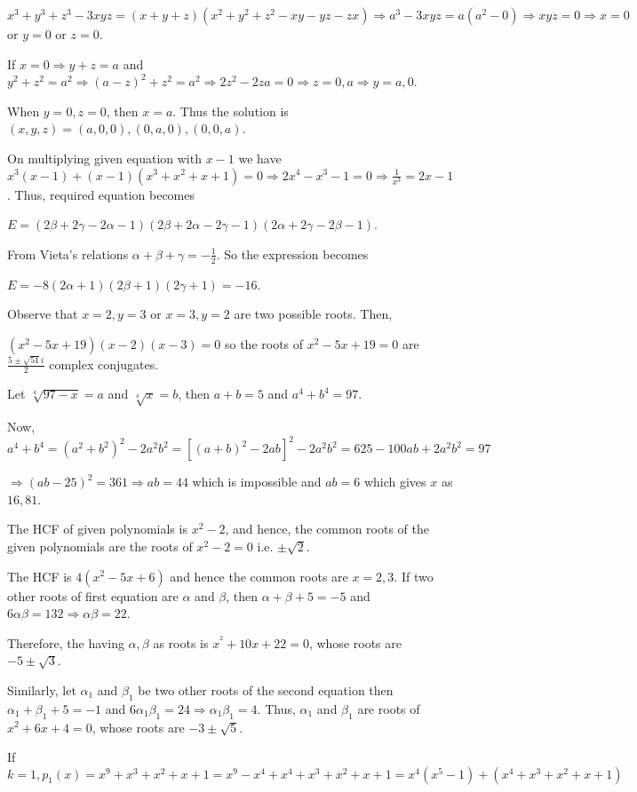   $x^3 + y^3 + z^3 - 3xyz = (x + y + z)(x^2 + y^2 + z^2 - xy - yz - zx) \Rightarrow a^3 - 3xyz = a(a^2 - 0)
  \Rightarrow xyz = 0 \Rightarrow x = 0$ or $y = 0$ or $z = 0$.

  If $x = 0 \Rightarrow y + z = a$ and $y^2 + z^2 = a^2 \Rightarrow (a - z)^2 + z^2 = a^2 \Rightarrow 2z^2 -
  2za = 0 \Rightarrow z = 0, a\Rightarrow y = a, 0$.

  When $y = 0, z = 0$, then $x = a$. Thus the solution is $(x, y, z) = (a, 0, 0), (0, a, 0), (0, 0, a)$.
\item On multiplying given equation with $x - 1$ we have $x^3(x - 1) + (x - 1)(x^3 + x^2 + x + 1) = 0
  \Rightarrow 2x^4 - x^3 - 1 = 0 \Rightarrow \frac{1}{x^3} = 2x - 1$. Thus, required equation becomes

  $E = (2\beta + 2\gamma - 2\alpha - 1)(2\beta + 2\alpha - 2\gamma - 1)(2\alpha + 2\gamma - 2\beta - 1)$.

  From Vieta's relations $\alpha + \beta + \gamma = -\frac{1}{2}$. So the expression becomes

  $E = -8(2\alpha + 1)(2\beta + 1)(2\gamma + 1) = -16$.
\item Observe that $x = 2, y = 3$ or $x = 3, y = 2$ are two possible roots. Then,

  $(x^2 - 5x + 19)(x - 2)(x - 3) = 0$ so the roots of $x^2 - 5x + 19 = 0$ are $\frac{5\pm\sqrt{51}i}{2}$
  complex conjugates.
\item Let $\sqrt[4]{97 - x} = a$ and $\sqrt[4]{x} = b$, then $a + b = 5$ and $a^4 + b^4 = 97$.

  Now, $a^4 + b^4 = (a^2 + b^2)^2 - 2a^2b^2 = [(a + b)^2 - 2ab]^2 - 2a^2b^2 = 625 - 100ab + 2a^2b^2 = 97$

  $\Rightarrow (ab - 25)^2 = 361 \Rightarrow ab = 44$ which is impossible and $ab = 6$ which gives $x$ as
  $16, 81$.
\item The HCF of given polynomials is $x^2 - 2$, and hence, the common roots of the given polynomials are
  the roots of $x^2 - 2 = 0$ i.e. $\pm\sqrt{2}$.
\item The HCF is $4(x^2 - 5x + 6)$ and hence the common roots are $x = 2, 3$. If two other roots of first
  equation are $\alpha$ and $\beta$, then $\alpha + \beta + 5 = -5$ and $6\alpha\beta = 132 \Rightarrow
  \alpha\beta = 22$.

  Therefore, the having $\alpha, \beta$ as roots is $x^^2 + 10x + 22 = 0$, whose roots are $-5\pm\sqrt{3}$.

  Similarly, let $\alpha_1$ and $\beta_1$ be two other roots of the second equation then $\alpha_1 + \beta_1
  + 5 = -1$ and $6\alpha_1\beta_1 = 24 \Rightarrow \alpha_1\beta_1 = 4$. Thus, $\alpha_1$ and $\beta_1$ are
  roots of $x^2 + 6x + 4 = 0$, whose roots are $-3\pm\sqrt{5}$.
\item If $k = 1, p_1(x) = x^9 + x^3 + x^2 + x + 1 = x^9 - x^4 + x^4 + x^3 + x^2 + x + 1 = x^4(x^5 - 1) +
  (x^4 + x^3 + x^2 + x + 1)$

